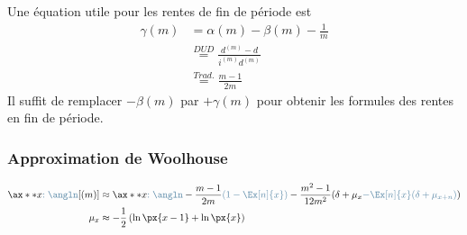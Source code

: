 \documentclass[10pt, french]{article}
\begin{document}
\begin{multicols*}{3}
Une équation utile pour les rentes de fin de période est 
\begin{align*}
	\gamma(m) 
	&=	\alpha(m) - \beta(m) - \frac{1}{m}	\\
	&\overset{DUD}{=} \frac{d^{(m)} - d}{i^{(m)} d^{(m)}}	\\
	&\overset{Trad.}{=} \frac{m - 1}{2m}	
\end{align*}
Il suffit de remplacer $-\beta(m)$ par $+\gamma(m)$ pour obtenir les formules des rentes en fin de période.



\subsubsection*{Approximation de Woolhouse}
\begin{align*}
	\ax**{x\color{airforceblue}{:\angln}}[(m)]	
	&\approx	\ax**{x\textcolor{airforceblue}{:\angln}}	-	
		\frac{m - 1}{2m} \textcolor{airforceblue}{\left( 1 - \Ex[n]{x} \right)}	-	
		\frac{m^{2} - 1}{12m^{2}}(\delta + \mu_{x} \textcolor{airforceblue}{- \Ex[n]{x} (\delta + \mu_{x + n})})		\\
	\mu_{x}
	&\approx		-	\frac{1}{2} \left( \ln \px{x - 1} + \ln \px{x} \right)
\end{align*}	






\end{multicols*}
\end{document}
